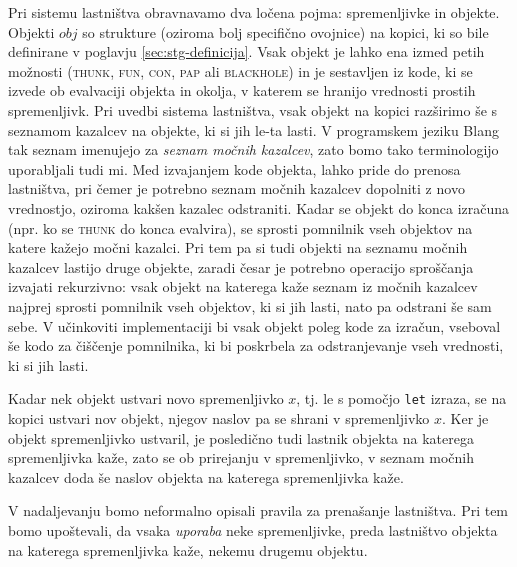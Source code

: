 Pri sistemu lastništva obravnavamo dva ločena pojma: spremenljivke in objekte. Objekti $obj$ so strukture (oziroma bolj specifično ovojnice) na kopici, ki so bile definirane v poglavju \ref{sec:stg-definicija}. Vsak objekt je lahko ena izmed petih možnosti (\textsc{thunk}, \textsc{fun}, \textsc{con}, \textsc{pap} ali \textsc{blackhole}) in je sestavljen iz kode, ki se izvede ob evalvaciji objekta in okolja, v katerem se hranijo vrednosti prostih spremenljivk. Pri uvedbi sistema lastništva, vsak objekt na kopici razširimo še s seznamom kazalcev na objekte, ki si jih le-ta lasti. V programskem jeziku Blang~\cite{turk2022len} tak seznam imenujejo za \textit{seznam močnih kazalcev}, zato bomo tako terminologijo uporabljali tudi mi. Med izvajanjem kode objekta, lahko pride do prenosa lastništva, pri čemer je potrebno seznam močnih kazalcev dopolniti z novo vrednostjo, oziroma kakšen kazalec odstraniti. Kadar se objekt do konca izračuna (npr. ko se \textsc{thunk} do konca evalvira), se sprosti pomnilnik vseh objektov na katere kažejo močni kazalci. Pri tem pa si tudi objekti na seznamu močnih kazalcev lastijo druge objekte, zaradi česar je potrebno operacijo sproščanja izvajati rekurzivno: vsak objekt na katerega kaže seznam iz močnih kazalcev najprej sprosti pomnilnik vseh objektov, ki si jih lasti, nato pa odstrani še sam sebe. V učinkoviti implementaciji bi vsak objekt poleg kode za izračun, vseboval še kodo za čiščenje pomnilnika, ki bi poskrbela za odstranjevanje vseh vrednosti, ki si jih lasti.

Kadar nek objekt ustvari novo spremenljivko $x$, tj. le s pomočjo \texttt{let} izraza, se na kopici ustvari nov objekt, njegov naslov pa se shrani v spremenljivko $x$. Ker je objekt spremenljivko ustvaril, je posledično tudi lastnik objekta na katerega spremenljivka kaže, zato se ob prirejanju v spremenljivko, v seznam močnih kazalcev doda še naslov objekta na katerega spremenljivka kaže.

V nadaljevanju bomo neformalno opisali pravila za prenašanje lastništva. Pri tem bomo upoštevali, da vsaka \emph{uporaba} neke spremenljivke, preda lastništvo objekta na katerega spremenljivka kaže, nekemu drugemu objektu.

